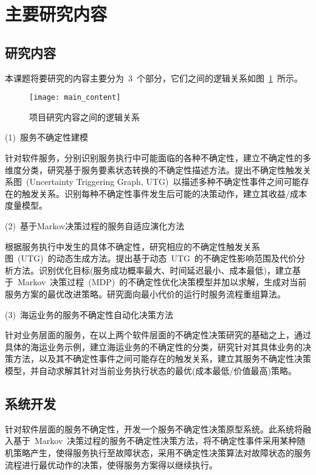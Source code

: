 \section{主要研究内容}
\subsection{研究内容}

本课题将要研究的内容主要分为~3~个部分，它们之间的逻辑关系如图~\ref{main_content}~所示。

\begin{figure}[htbp]
    \centering
    \texttt{[image: main\_content]}
    \caption{项目研究内容之间的逻辑关系}\label{main_content}
    \vspace{-1em}
\end{figure}

(1)~服务不确定性建模

针对软件服务，分别识别服务执行中可能面临的各种不确定性，建立不确定性的多维度分类，研究基于服务要素状态转换的不确定性描述方法。提出不确定性触发关系图~(Uncertainty Triggering Graph, UTG)~以描述多种不确定性事件之间可能存在的触发关系。识别每种不确定性事件发生后可能的决策动作，建立其收益/成本度量模型。

(2)~基于Markov决策过程的服务自适应演化方法

根据服务执行中发生的具体不确定性，研究相应的不确定性触发关系图~(UTG)~的动态生成方法。提出基于动态~UTG~的不确定性影响范围及代价分析方法。识别优化目标(服务成功概率最大、时间延迟最小、成本最低)，建立基于~Markov~决策过程~(MDP)~的不确定性优化决策模型并加以求解，生成对当前服务方案的最优改进策略。研究面向最小代价的运行时服务流程重组算法。

(3)~海运业务的服务不确定性自动化决策方法

针对业务层面的服务，在以上两个软件层面的不确定性决策研究的基础之上，通过具体的海运业务示例，建立海运业务的不确定性的分类，研究针对其具体业务的决策方法，以及其不确定性事件之间可能存在的触发关系，建立其服务不确定性决策模型，并自动求解其针对当前业务执行状态的最优(成本最低/价值最高)策略。

\subsection{系统开发}

针对软件层面的服务不确定性，开发一个服务不确定性决策原型系统。此系统将融入基于~Markov~决策过程的服务不确定性决策方法，将不确定性事件采用某种随机策略产生，使得服务执行至故障状态，采用不确定性决策算法对故障状态的服务流程进行最优动作的决策，使得服务方案得以继续执行。

